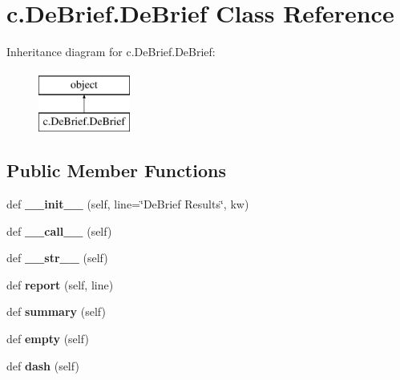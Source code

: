 \hypertarget{classc_1_1_de_brief_1_1_de_brief}{}\section{c.\+De\+Brief.\+De\+Brief Class Reference}
\label{classc_1_1_de_brief_1_1_de_brief}
Inheritance diagram for c.\+De\+Brief.\+De\+Brief\+:\begin{figure}[H]
\begin{center}
\leavevmode
\includegraphics[height=2.000000cm]{classc_1_1_de_brief_1_1_de_brief}
\end{center}
\end{figure}
\subsection*{Public Member Functions}
\begin{DoxyCompactItemize}
\item 
\hypertarget{classc_1_1_de_brief_1_1_de_brief_ae8e09d2674bdfc4190330a3099311973}{}def {\bfseries \+\_\+\+\_\+init\+\_\+\+\_\+} (self, line=\char`\"{}De\+Brief Results\char`\"{}, kw)\label{classc_1_1_de_brief_1_1_de_brief_ae8e09d2674bdfc4190330a3099311973}

\item 
\hypertarget{classc_1_1_de_brief_1_1_de_brief_ac723c58ba13bd4b52336e5dd047581e1}{}def {\bfseries \+\_\+\+\_\+call\+\_\+\+\_\+} (self)\label{classc_1_1_de_brief_1_1_de_brief_ac723c58ba13bd4b52336e5dd047581e1}

\item 
\hypertarget{classc_1_1_de_brief_1_1_de_brief_ab0a283d7aed66574ee320844ca2e1cfa}{}def {\bfseries \+\_\+\+\_\+str\+\_\+\+\_\+} (self)\label{classc_1_1_de_brief_1_1_de_brief_ab0a283d7aed66574ee320844ca2e1cfa}

\item 
\hypertarget{classc_1_1_de_brief_1_1_de_brief_acc4c0719d3ddf7060afaf84667c702c4}{}def {\bfseries report} (self, line)\label{classc_1_1_de_brief_1_1_de_brief_acc4c0719d3ddf7060afaf84667c702c4}

\item 
\hypertarget{classc_1_1_de_brief_1_1_de_brief_a9fc39f8add3a4233a20ab9246e385354}{}def {\bfseries summary} (self)\label{classc_1_1_de_brief_1_1_de_brief_a9fc39f8add3a4233a20ab9246e385354}

\item 
\hypertarget{classc_1_1_de_brief_1_1_de_brief_aa17666354bdd7236997d346330a95c5a}{}def {\bfseries empty} (self)\label{classc_1_1_de_brief_1_1_de_brief_aa17666354bdd7236997d346330a95c5a}

\item 
\hypertarget{classc_1_1_de_brief_1_1_de_brief_a5dc5bbc6ab177f82fc5d682b672e5843}{}def {\bfseries dash} (self)\label{classc_1_1_de_brief_1_1_de_brief_a5dc5bbc6ab177f82fc5d682b672e5843}

\end{DoxyCompactItemize}
